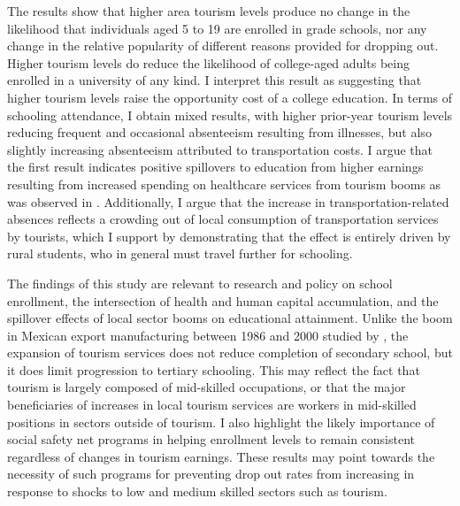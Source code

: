 \documentclass[12pt]{article}
\begin{document}
	
	 
	 The results show that higher area tourism levels produce no change in the likelihood that individuals aged 5 to 19 are enrolled in grade schools, nor any change in the relative popularity of different reasons provided for dropping out. Higher tourism levels do reduce the likelihood of college-aged adults being enrolled in a university of any kind. I interpret this result as suggesting that higher tourism levels raise the opportunity cost of a college education. In terms of schooling attendance, I obtain mixed results, with higher prior-year tourism levels reducing frequent and occasional absenteeism resulting from illnesses, but also slightly increasing absenteeism attributed to transportation costs. I argue that the first result indicates positive spillovers to education from higher earnings resulting from increased spending on healthcare services from tourism booms as was observed in \textcite{ mcketty_sun_2026}. Additionally, I argue that the increase in transportation-related absences reflects a crowding out of local consumption of transportation services by tourists, which I support by demonstrating that the effect is entirely driven by rural students, who in general must travel further for schooling.  
	 
	 The findings of this study are relevant to research and policy on school enrollment, the intersection of health and human capital accumulation, and the spillover effects of local sector booms on educational attainment. Unlike the boom in Mexican export manufacturing between 1986 and 2000 studied by \textcite{ atkin_endogenous_2016}, the expansion of tourism services does not reduce completion of secondary school, but it does limit progression to tertiary schooling. This may reflect the fact that tourism is largely composed of mid-skilled occupations, or that the major beneficiaries of increases in local tourism services are workers in mid-skilled positions in sectors outside of tourism\parencite{ mcketty_sun_2026}. I also highlight the likely importance of social safety net programs in helping enrollment levels to remain consistent regardless of changes in tourism earnings. These results may point towards the necessity of such programs for preventing drop out rates from increasing in response to shocks to low and medium skilled sectors such as tourism.
	 
\end{document}
